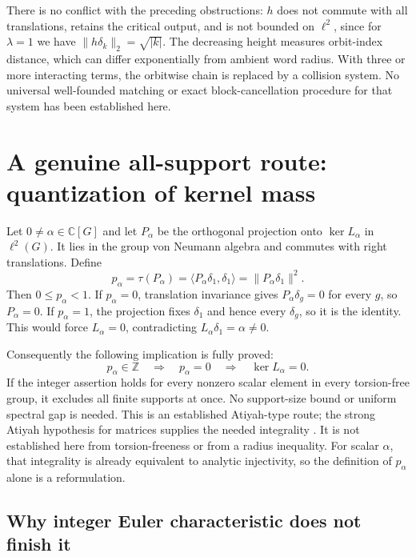 \documentclass[11pt,a4paper,oneside]{report}
\theoremstyle{definition}
\theoremstyle{remark}
\newcommand{\C}{\mathbb C}
\newcommand{\Z}{\mathbb Z}
\begin{document}
There is no conflict with the preceding obstructions: $h$
does not commute with all translations, retains the critical
output, and is not bounded on $\ell^2$, since for $\lambda=1$
we have $\|h\delta_k\|_2=\sqrt{|k|}$.
The decreasing height measures orbit-index distance, which
can differ exponentially from ambient word radius. With
three or more interacting terms, the orbitwise chain is
replaced by a collision system. No universal well-founded
matching or exact block-cancellation procedure for that system
has been established here.

\section{A genuine all-support route: quantization of kernel mass}\label{M07:sec:quantization}

Let $0\ne\alpha\in\C[G]$ and let $P_\alpha$ be the
orthogonal projection onto $\ker L_\alpha$ in $\ell^2(G)$.
It lies in the group von Neumann algebra and commutes
with right translations. Define
\[
p_\alpha=\tau(P_\alpha)
=\langle P_\alpha\delta_1,\delta_1\rangle
=\|P_\alpha\delta_1\|^2.
\]
Then $0\le p_\alpha<1$. If $p_\alpha=0$, translation
invariance gives $P_\alpha\delta_g=0$ for every $g$,
so $P_\alpha=0$. If $p_\alpha=1$, the projection fixes
$\delta_1$ and hence every $\delta_g$, so it is the
identity. This would force $L_\alpha=0$, contradicting
$L_\alpha\delta_1=\alpha\ne0$.

Consequently the following implication is fully proved:
\begin{equation}\label{M07:eq:integer}
\boxed{p_\alpha\in\Z\quad\Longrightarrow\quad
p_\alpha=0\quad\Longrightarrow\quad\ker L_\alpha=0.}
\end{equation}
If the integer assertion holds for every nonzero scalar
element in every torsion-free group, it excludes all
finite supports at once. No support-size bound or
uniform spectral gap is needed. This is an established
Atiyah-type route; the strong Atiyah hypothesis for
matrices supplies the needed integrality
\cite{B:LS,B:LR}. It is not established here from
torsion-freeness or from a radius inequality. For scalar
$\alpha$, that integrality is already equivalent to
analytic injectivity, so the definition of $p_\alpha$
alone is a reformulation.

\subsection{Why integer Euler characteristic does not finish it}
\end{document}
